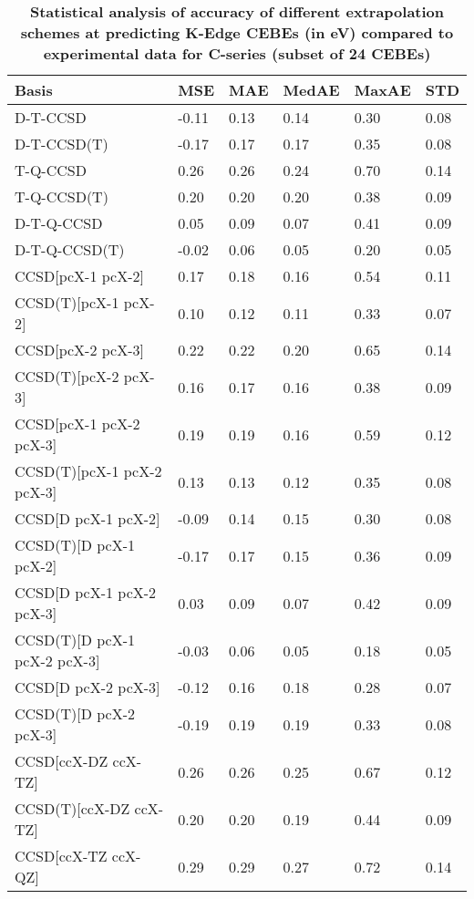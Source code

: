 \begin{table}
  \caption{\textbf{Statistical analysis of accuracy of different extrapolation schemes at predicting K-Edge CEBEs (in eV) compared to experimental data for C-series (subset of 24 CEBEs)}}
  \begin{tabular}{l l l l l l }
    \toprule
    \textbf{Basis} & \textbf{MSE} & \textbf{MAE} & \textbf{MedAE} & \textbf{MaxAE} & \textbf{STD} \\ 
    \midrule
    D-T-CCSD & -0.11 & 0.13 & 0.14 & 0.30 & 0.08 \\ 
    D-T-CCSD(T) & -0.17 & 0.17 & 0.17 & 0.35 & 0.08 \\ 
    T-Q-CCSD & 0.26 & 0.26 & 0.24 & 0.70 & 0.14 \\ 
    T-Q-CCSD(T) & 0.20 & 0.20 & 0.20 & 0.38 & 0.09 \\ 
    D-T-Q-CCSD & 0.05 & 0.09 & 0.07 & 0.41 & 0.09 \\ 
    D-T-Q-CCSD(T) & -0.02 & 0.06 & 0.05 & 0.20 & 0.05 \\ 
    CCSD[pcX-1 pcX-2] & 0.17 & 0.18 & 0.16 & 0.54 & 0.11 \\ 
    CCSD(T)[pcX-1 pcX-2] & 0.10 & 0.12 & 0.11 & 0.33 & 0.07 \\ 
    CCSD[pcX-2 pcX-3] & 0.22 & 0.22 & 0.20 & 0.65 & 0.14 \\ 
    CCSD(T)[pcX-2 pcX-3] & 0.16 & 0.17 & 0.16 & 0.38 & 0.09 \\ 
    CCSD[pcX-1 pcX-2 pcX-3] & 0.19 & 0.19 & 0.16 & 0.59 & 0.12 \\ 
    CCSD(T)[pcX-1 pcX-2 pcX-3] & 0.13 & 0.13 & 0.12 & 0.35 & 0.08 \\ 
    CCSD[D pcX-1 pcX-2] & -0.09 & 0.14 & 0.15 & 0.30 & 0.08 \\ 
    CCSD(T)[D pcX-1 pcX-2] & -0.17 & 0.17 & 0.15 & 0.36 & 0.09 \\ 
    CCSD[D pcX-1 pcX-2 pcX-3] & 0.03 & 0.09 & 0.07 & 0.42 & 0.09 \\ 
    CCSD(T)[D pcX-1 pcX-2 pcX-3] & -0.03 & 0.06 & 0.05 & 0.18 & 0.05 \\ 
    CCSD[D pcX-2 pcX-3] & -0.12 & 0.16 & 0.18 & 0.28 & 0.07 \\ 
    CCSD(T)[D pcX-2 pcX-3] & -0.19 & 0.19 & 0.19 & 0.33 & 0.08 \\ 
    CCSD[ccX-DZ ccX-TZ] & 0.26 & 0.26 & 0.25 & 0.67 & 0.12 \\ 
    CCSD(T)[ccX-DZ ccX-TZ] & 0.20 & 0.20 & 0.19 & 0.44 & 0.09 \\ 
    CCSD[ccX-TZ ccX-QZ] & 0.29 & 0.29 & 0.27 & 0.72 & 0.14 \\ 

\end{tabular}
\end{table}
